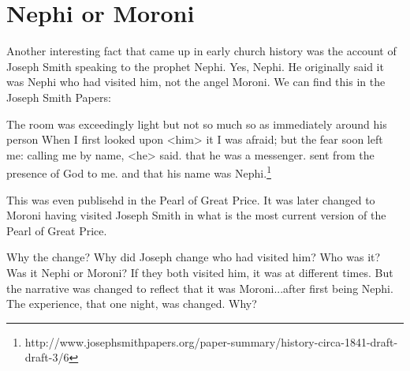 \section{Nephi or Moroni}

Another interesting fact that came up in early church history was the account of
Joseph Smith speaking to the prophet Nephi. Yes, Nephi. He originally said it
was Nephi who had visited him, not the angel Moroni. We can find this in the
Joseph Smith Papers:

\begin{displayquote}
The room was exceedingly light but not so much so as immediately around his 
person When I first looked upon <​him​> it I was afraid; but the fear soon left 
me: calling me by name, <he> said. that he was a messenger. sent from the 
presence of God to me. and that his name was Nephi.\footnote{
http://www.josephsmithpapers.org/paper-summary/history-circa-1841-draft-draft-3/6
}
\end{displayquote}

This was even publisehd in the Pearl of Great Price. It was later changed to
Moroni having visited Joseph Smith in what is the most current version of the
Pearl of Great Price.

Why the change? Why did Joseph change who had visited him? Who was it? Was it
Nephi or Moroni? If they both visited him, it was at different times. But the
narrative was changed to reflect that it was Moroni...after first being Nephi.
The experience, that one night, was changed. Why?